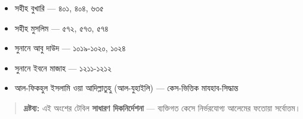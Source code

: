 \begin{itemize}
\item সহীহ বুখারি — ৪০১, ৪০৪, ৬৩৫
\item সহীহ মুসলিম — ৫৭২, ৫৭৩, ৫৭৪
\item সুনানে আবু দাউদ — ১০১৯-১০২০, ১০২৪
\item সুনানে ইবনে মাজাহ — ১২১১-১২১২
\item আল-ফিকহুল ইসলামি ওয়া আদিল্লাতুহু (আল-যুহাইলি) — কেস-ভিত্তিক মাযহাব-সিদ্ধান্ত
\end{itemize}
\begin{quote}
\textbf{দ্রষ্টব্য:} এই অংশের টেবিল \textbf{সাধারণ দিকনির্দেশনা} — ব্যক্তিগত কেসে নির্ভরযোগ্য আলেমের ফতোয়া সর্বোত্তম।
\end{quote}


